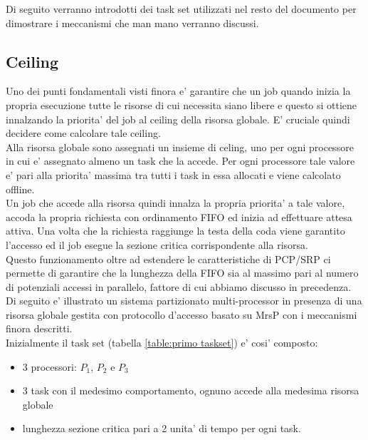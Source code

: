 \documentclass[a4paper,11pt]{article}
\begin{document}
\noindent Di seguito verranno introdotti dei task set utilizzati nel resto del documento per dimostrare i meccanismi che man mano verranno discussi.\\

\subsection{Ceiling}

\noindent Uno dei punti fondamentali visti finora e' garantire che un job quando inizia la propria esecuzione tutte le risorse di cui necessita siano libere e questo si ottiene innalzando la priorita' del job al ceiling della risorsa globale. E' cruciale quindi decidere come calcolare tale ceiling.\\

\noindent Alla risorsa globale sono assegnati un insieme di celing, uno per ogni processore in cui e' assegnato almeno un task che la accede. Per ogni processore tale valore e' pari alla priorita' massima tra tutti i task in essa allocati e viene calcolato offline.\\

\noindent Un job che accede alla risorsa quindi innalza la propria priorita' a tale valore, accoda la propria richiesta con ordinamento FIFO ed inizia ad effettuare attesa attiva. Una volta che la richiesta raggiunge la testa della coda viene garantito l'accesso ed il job esegue la sezione critica corrispondente alla risorsa.\\

\noindent Questo funzionamento oltre ad estendere le caratteristiche di PCP/SRP ci permette di garantire che la lunghezza della FIFO sia al massimo pari al numero di potenziali accessi in parallelo, fattore di cui abbiamo discusso in precedenza.\\

\noindent Di seguito e' illustrato un sistema partizionato multi-processor in presenza di una risorsa globale gestita con protocollo d'accesso basato su MrsP con i meccanismi finora descritti.\\

\noindent Inizialmente il task set (tabella \ref{table:primo taskset}) e' cosi' composto:

\begin{itemize}
\item 3 processori: $P_1$, $P_2$ e $P_3$
\item 3 task con il medesimo comportamento, ognuno accede alla medesima risorsa globale
\item lunghezza sezione critica pari a 2 unita' di tempo per ogni task.
\end{itemize}
\end{document}
